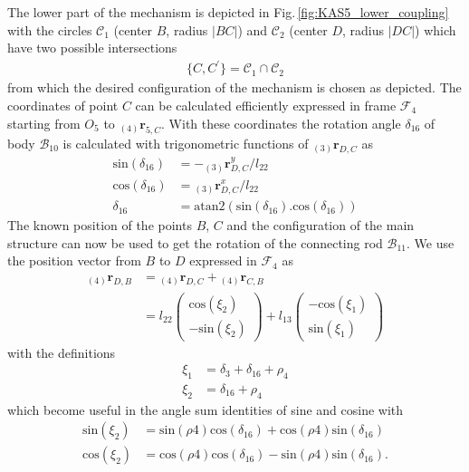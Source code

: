 \documentclass[letterpaper, 10 pt, conference]{ieeeconf}  %
\newcommand{\body}[1]{\mathcal{B}_{#1}}
\newcommand{\ks}[1]{\mathcal{F}_{#1}}
\newcommand{\cc}[1]{\mathcal{C}_{#1}}
\newcommand{\ortvek}[3]{{ }_{(#1)}{\boldsymbol{r}}^{#2}_{#3}}
\begin{document}
The lower part of the mechanism is depicted in Fig.\,\ref{fig:KAS5_lower_coupling} with the circles $\cc{1}$ (center $B$, radius $|BC|$) and $\cc{2}$ (center $D$, radius $|DC|$) which have two possible intersections
%
\begin{align}
\{C, C^\prime\} = \cc{1} \cap \cc{2}
\end{align}
%
from which the desired configuration of the mechanism is chosen as depicted.
The coordinates of point $C$ can be calculated efficiently expressed in frame $\ks{4}$ starting from $O_5$ to $\ortvek{4}{}{5,C}$.
%
With these coordinates the rotation angle $\delta_{16}$ of body $\body{10}$ is calculated with trigonometric functions of $\ortvek{3}{}{D,C}$ as
%
\begin{align}
\mathrm{sin}(\delta_{16}) &= -\ortvek{3}{y}{D,C} / l_{22} \\
\mathrm{cos}(\delta_{16}) &= \ortvek{3}{x}{D,C} / l_{22} \\
\delta_{16} &= \mathrm{atan2}(\mathrm{sin}(\delta_{16}). \mathrm{cos}(\delta_{16}))
\end{align}
%
The known position of the points $B$, $C$ and the configuration of the main structure can now be used to get the rotation of the connecting rod $\body{11}$.
We use the position vector from $B$ to $D$ expressed in $\ks{4}$ as
%
\begin{align}
\ortvek{4}{}{D,B} &= \ortvek{4}{}{D,C} + \ortvek{4}{}{C,B} \\
 &= l_{22}\begin{pmatrix}\mathrm{cos}(\xi_2)\\ -\mathrm{sin}(\xi_2) \end{pmatrix} + l_{13}\begin{pmatrix}-\mathrm{cos}(\xi_1)\\ \mathrm{sin}(\xi_1) \end{pmatrix}
\label{equ:delta3_r4DB}
\end{align}
%
with the definitions
%
\begin{align}
\xi_1 &= \delta_3+\delta_{16}+\rho_4 \\
\xi_2 &= \delta_{16}+\rho_4
\end{align}
%
which become useful in the angle sum identities of sine and cosine with
%
\begin{align}
\mathrm{sin}(\xi_2)&=\mathrm{sin}(\rho4)\mathrm{cos}(\delta_{16})+\mathrm{cos}(\rho4)\mathrm{sin}(\delta_{16}) \nonumber \\
\mathrm{cos}(\xi_2)&=\mathrm{cos}(\rho4)\mathrm{cos}(\delta_{16})-\mathrm{sin}(\rho4)\mathrm{sin}(\delta_{16}). \nonumber \\
\label{equ:delta3_xi2_addtheorem}
\end{align}
\end{document}
